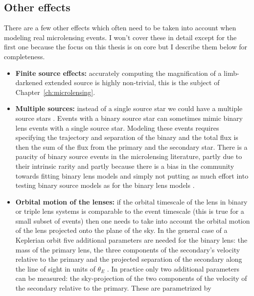 \documentclass[12pt,dvipsnames]{report}
\begin{document}
\subsection{Other effects}
There are a few other effects which often need to be taken into account when
modeling real microlensing events. I won't cover these in detail except for the
first one because the focus on this thesis is on core but I describe them below
for completeness.
\begin{itemize}
    \item \textbf{Finite source effects:} accurately computing the magnification
          of a limb-darkened extended source is highly non-trivial, this is the subject
          of Chapter~\ref{ch:microlensing}.
    \item \textbf{Multiple sources:} instead of a single source star we could have
          a multiple source stars \citep{1998A&A...333..893D}.  Events with a binary source
          star can sometimes mimic binary lens events with a single source star.
          Modeling these events requires specifying the trajectory and separation of
          the binary and the total flux is then the sum of the flux from the primary and the
          secondary star.
          There is a paucity of binary source events in the microlensing literature, partly due to
          their intrinsic rarity \citep{1998MNRAS.301..231H} and partly because there is a
          bias in the community towards fitting binary lens models and
          simply not putting as much effort into testing binary source models as
          for the binary lens models \citep{2017AJ....153..129J,2019MNRAS.484.5608D}.
    \item \textbf{Orbital motion of the lenses:} if the orbital timescale of
          the lens in binary or triple lens systems is comparable to the event timescale
          (this is true for a small subset of events) then one needs to take into account
          the orbital motion of the lens projected onto the plane of the sky.
          In the general case of a Keplerian orbit five additional parameters are needed
          for the binary lens: the mass of the primary lens, the three components of the
          secondary's velocity relative to the primary and the projected separation
          of the secondary along the line of sight in units of $\theta_E$
          \citep{1998A&A...329..361D}. In practice only two additional parameters
          can be measured: the sky-projection of the two components of the velocity of
          the secondary relative to the primary. These are parametrized by

\end{itemize}
\end{document}

